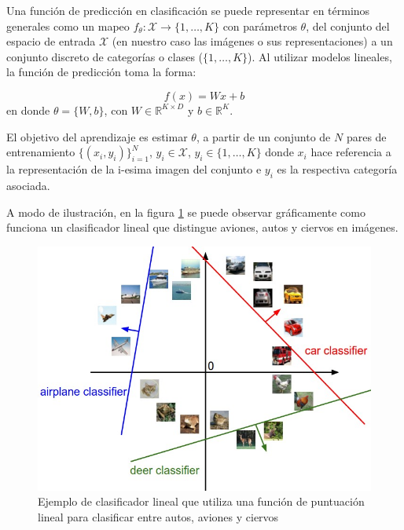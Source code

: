 \documentclass[a4paper,11pt,spanish]{book}
\begin{document}
	  Una función de predicción en clasificación se puede representar en términos generales como un mapeo $f_{\theta}: \mathcal{X}
          {\rightarrow} \{1,\dots,K\}$ con parámetros $\theta$, del conjunto del espacio de entrada $\mathcal{X}$ (en nuestro caso las imágenes o sus
          representaciones) a un conjunto discreto de categorías o clases ($\{1,\dots,K\}$). 
          Al utilizar modelos lineales, la función de predicción toma la forma:
          
          \begin{equation} \label{eq:linear_classifier}
            f(x) = W x + b
          \end{equation}
          en donde $\theta=\{W, b\}$, con $W\in\mathbb{R}^{K \times D}$ y $b\in\mathbb{R}^K$.
          
          El objetivo del aprendizaje es estimar $\theta$, a partir de un conjunto de $N$ pares de entrenamiento $\{(x_i, y_i)\}_{i=1}^N$, $y_i \in \mathcal{X}$, $y_i\in\{1,\dots,K\}$
          donde $x_i$ hace referencia a la representación de la i-esima imagen del conjunto e $y_i$ es la respectiva categoría asociada.
	  
	  A modo de ilustración, en la figura \ref{fig:linear_classifier} se puede observar gráficamente como funciona un clasificador lineal 
	  que distingue aviones, autos y ciervos en imágenes.
	  
	  \begin{figure}[ht]
	    \begin{center}
	     \includegraphics[width=0.8\linewidth]{./img/stanford_linear_class.jpeg}
	    \end{center}
	    \caption{Ejemplo de clasificador lineal que utiliza una función de puntuación lineal para clasificar entre autos, aviones y ciervos}
	    \label{fig:linear_classifier}
	  \end{figure}
\end{document}
